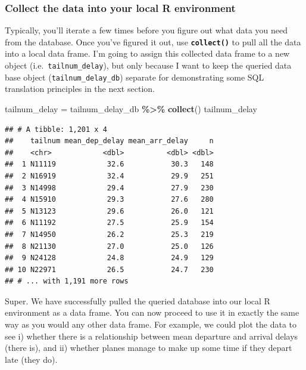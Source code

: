 \documentclass[
]{article}
\newenvironment{Shaded}{\begin{snugshade}}{\end{snugshade}}
\newcommand{\FunctionTok}[1]{\textcolor[rgb]{0.13,0.29,0.53}{\textbf{#1}}}
\newcommand{\NormalTok}[1]{#1}
\newcommand{\OtherTok}[1]{\textcolor[rgb]{0.56,0.35,0.01}{#1}}
\newcommand{\SpecialCharTok}[1]{\textcolor[rgb]{0.81,0.36,0.00}{\textbf{#1}}}
\begin{document}
\hypertarget{collect-the-data-into-your-local-r-environment}{%
\subsubsection{Collect the data into your local R
environment}\label{collect-the-data-into-your-local-r-environment}}

Typically, you'll iterate a few times before you figure out what data
you need from the database. Once you've figured it out, use
\textbf{\texttt{collect()}} to pull all the data into a local data
frame. I'm going to assign this collected data frame to a new object
(i.e.~\texttt{tailnum\_delay}), but only because I want to keep the
queried data base object (\texttt{tailnum\_delay\_db}) separate for
demonstrating some SQL translation principles in the next section.

\begin{Shaded}
\begin{Highlighting}[]
\NormalTok{tailnum\_delay }\OtherTok{=} 
\NormalTok{  tailnum\_delay\_db }\SpecialCharTok{\%\textgreater{}\%} 
  \FunctionTok{collect}\NormalTok{()}
\NormalTok{tailnum\_delay}
\end{Highlighting}
\end{Shaded}

\begin{verbatim}
## # A tibble: 1,201 x 4
##    tailnum mean_dep_delay mean_arr_delay     n
##    <chr>            <dbl>          <dbl> <dbl>
##  1 N11119            32.6           30.3   148
##  2 N16919            32.4           29.9   251
##  3 N14998            29.4           27.9   230
##  4 N15910            29.3           27.6   280
##  5 N13123            29.6           26.0   121
##  6 N11192            27.5           25.9   154
##  7 N14950            26.2           25.3   219
##  8 N21130            27.0           25.0   126
##  9 N24128            24.8           24.9   129
## 10 N22971            26.5           24.7   230
## # ... with 1,191 more rows
\end{verbatim}

Super. We have successfully pulled the queried database into our local R
environment as a data frame. You can now proceed to use it in exactly
the same way as you would any other data frame. For example, we could
plot the data to see i) whether there is a relationship between mean
departure and arrival delays (there is), and ii) whether planes manage
to make up some time if they depart late (they do).
\end{document}
